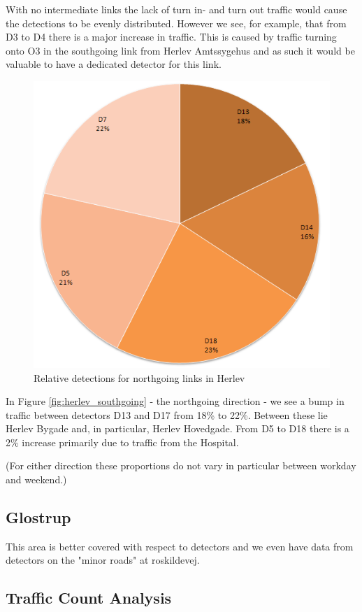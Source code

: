With no intermediate links the lack of turn in- and turn out traffic would cause the detections to be evenly distributed. However we see, for example, that from D3 to D4 there is a major increase in traffic. This is caused by traffic turning onto O3 in the southgoing link from Herlev Amtssygehus and as such it would be valuable to have a dedicated detector for this link.

\begin{figure}[!ht]
\begin{center}
\includegraphics[scale=0.4]{herlev_northgoing_detectors.png} 
\end{center}
\caption{Relative detections for northgoing links in Herlev}
\label{fig:herlev_northgoing}
\end{figure}

In Figure \ref{fig:herlev_southgoing} - the northgoing direction - we see a bump in traffic between detectors D13 and D17 from 18\% to 22\%. Between these lie Herlev Bygade and, in particular, Herlev Hovedgade. From D5 to D18 there is a 2\% increase primarily due to traffic from the Hospital.

(For either direction these proportions do not vary in particular between workday and weekend.)

\subsection{Glostrup}
This area is better covered with respect to detectors and we even have data from detectors on the "minor roads" at roskildevej.

\subsection{Traffic Count Analysis}
\label{traffic_count_analysis}